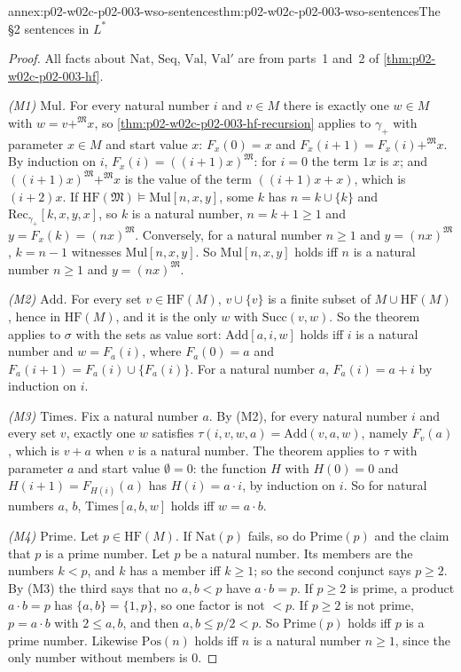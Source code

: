 \begin{annexitem}{annex:p02-w02c-p02-003-wso-sentences}{thm:p02-w02c-p02-003-wso-sentences}{The \S2 sentences in \(L^{*}\)}
\begin{proof}
All facts about \(\mathrm{Nat}\), \(\mathrm{Seq}\), \(\mathrm{Val}\),
\(\mathrm{Val}'\) are from parts~1 and~2 of \cref{thm:p02-w02c-p02-003-hf}.

\emph{(M1) \(\mathrm{Mul}\).}  For every natural number \(i\) and
\(v\in M\) there is exactly one \(w\in M\) with \(w=v+^{\mathfrak M}x\), so
\cref{thm:p02-w02c-p02-003-hf-recursion} applies to \(\gamma_+\) with
parameter \(x\in M\) and start value \(x\): \(F_x(0)=x\) and
\(F_x(i+1)=F_x(i)+^{\mathfrak M}x\).  By induction on \(i\),
\(F_x(i)=((i+1)x)^{\mathfrak M}\): for \(i=0\) the term \(1x\) is \(x\);
and \(((i+1)x)^{\mathfrak M}+^{\mathfrak M}x\) is the value of the term
\(((i+1)x+x)\), which is \((i+2)x\).  If
\(\mathrm{HF}(\mathfrak M)\models\mathrm{Mul}[n,x,y]\), some \(k\) has
\(n=k\cup\{k\}\) and \(\mathrm{Rec}_{\gamma_+}[k,x,y,x]\), so \(k\) is a
natural number, \(n=k+1\geq1\) and \(y=F_x(k)=(nx)^{\mathfrak M}\).
Conversely, for a natural number \(n\geq1\) and \(y=(nx)^{\mathfrak M}\),
\(k=n-1\) witnesses \(\mathrm{Mul}[n,x,y]\).  So
\(\mathrm{Mul}[n,x,y]\) holds iff \(n\) is a natural number \(n\geq1\) and
\(y=(nx)^{\mathfrak M}\).

\emph{(M2) \(\mathrm{Add}\).}  For every set \(v\in\mathrm{HF}(M)\),
\(v\cup\{v\}\) is a finite subset of \(M\cup\mathrm{HF}(M)\), hence in
\(\mathrm{HF}(M)\), and it is the only \(w\) with \(\mathrm{Succ}(v,w)\).
So the theorem applies to \(\sigma\) with the sets as value sort:
\(\mathrm{Add}[a,i,w]\) holds iff \(i\) is a natural number and
\(w=F_a(i)\), where \(F_a(0)=a\) and \(F_a(i+1)=F_a(i)\cup\{F_a(i)\}\).
For a natural number \(a\), \(F_a(i)=a+i\) by induction on \(i\).

\emph{(M3) \(\mathrm{Times}\).}  Fix a natural number \(a\).  By (M2), for
every natural number \(i\) and every set \(v\), exactly one \(w\)
satisfies \(\tau(i,v,w,a)=\mathrm{Add}(v,a,w)\), namely \(F_v(a)\), which
is \(v+a\) when \(v\) is a natural number.  The theorem applies to
\(\tau\) with parameter \(a\) and start value \(\emptyset=0\): the function
\(H\) with \(H(0)=0\) and \(H(i+1)=F_{H(i)}(a)\) has \(H(i)=a\cdot i\), by
induction on \(i\).  So for natural numbers \(a\), \(b\),
\(\mathrm{Times}[a,b,w]\) holds iff \(w=a\cdot b\).

\emph{(M4) \(\mathrm{Prime}\).}  Let \(p\in\mathrm{HF}(M)\).  If
\(\mathrm{Nat}(p)\) fails, so do \(\mathrm{Prime}(p)\) and the claim that
\(p\) is a prime number.  Let \(p\) be a natural number.  Its members are
the numbers \(k<p\), and \(k\) has a member iff \(k\geq1\); so the second
conjunct says \(p\geq2\).  By (M3) the third says that no \(a,b<p\) have
\(a\cdot b=p\).  If \(p\geq2\) is prime, a product \(a\cdot b=p\) has
\(\{a,b\}=\{1,p\}\), so one factor is not \(<p\).  If \(p\geq2\) is not
prime, \(p=a\cdot b\) with \(2\leq a,b\), and then \(a,b\leq p/2<p\).  So
\(\mathrm{Prime}(p)\) holds iff \(p\) is a prime number.  Likewise
\(\mathrm{Pos}(n)\) holds iff \(n\) is a natural number \(n\geq1\), since
the only number without members is \(0\).


\end{proof}
\end{annexitem}
